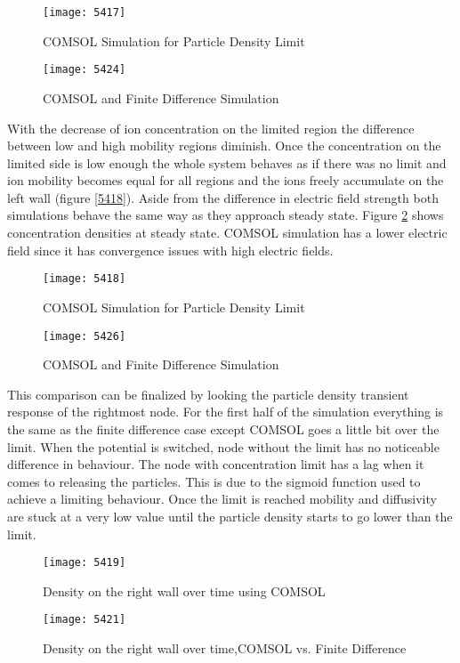 \begin{doublespace}
\begin{figure}[ht]
\centering
\begin{minipage}[b]{0.45\linewidth}
\texttt{[image: 5417]}
\caption{COMSOL Simulation for Particle Density Limit}
\label{5417}
\end{minipage}
\quad
\begin{minipage}[b]{0.45\linewidth}
\texttt{[image: 5424]}
\caption{COMSOL and Finite Difference Simulation}
\label{5424}
\end{minipage}
\end{figure}

With the decrease of ion concentration on the limited region the difference between low and high mobility regions diminish. Once the concentration on the limited side is low enough the whole system behaves as if there was no limit and ion mobility becomes equal for all regions and the ions freely accumulate on the left wall (figure \ref{5418}). Aside from the difference in electric field strength both simulations behave the same way as they approach steady state. Figure \ref{5426} shows concentration densities at steady state. COMSOL simulation has a lower electric field since it has convergence issues with high electric fields. 

\begin{figure}[ht]
\centering
\begin{minipage}[b]{0.45\linewidth}
\texttt{[image: 5418]}
\caption{COMSOL Simulation for Particle Density Limit}
\label{5418}
\end{minipage}
\quad
\begin{minipage}[b]{0.45\linewidth}
\texttt{[image: 5426]}
\caption{COMSOL and Finite Difference Simulation}
\label{5426}
\end{minipage}
\end{figure}

This comparison can be finalized by looking the particle density transient response of the rightmost node. For the first half of the simulation everything is the same as the finite difference case except COMSOL goes a little bit over the limit. When the potential is switched, node without the limit has no noticeable difference in behaviour. The node with concentration limit has a lag when it comes to releasing the particles. This is due to the sigmoid function used to achieve a limiting behaviour. Once the limit is reached mobility and diffusivity are stuck at a very low value until the particle density starts to go lower than the limit.
\begin{figure}[ht]
\centering
\begin{minipage}[b]{0.45\linewidth}
\texttt{[image: 5419]}
\caption{Density on the right wall over time using COMSOL}
\label{5419}
\end{minipage}
\quad
\begin{minipage}[b]{0.45\linewidth}
\texttt{[image: 5421]}
\caption{Density on the right wall over time,COMSOL vs. Finite Difference}
\label{5421}
\end{minipage}
\end{figure}


\end{doublespace}
